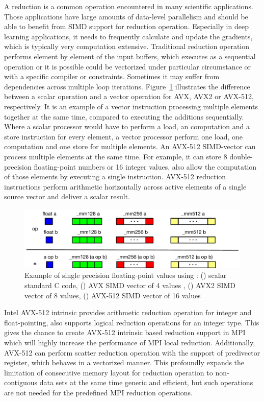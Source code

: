 \documentclass[5p,times,twocolumn]{elsarticle}
\newcommand{\mpi}[0]{\textsc{MPI}\xspace}
\begin{document}
A reduction is a common operation encountered in many scientific applications.
Those applications have large amounts of data-level parallelism and should be able
to benefit from SIMD support for reduction operation. Especially in deep learning applications,
it needs to frequently calculate and update the gradients, which is typically very computation extensive.
Traditional reduction operation performs element by element of the input buffers,
which executes as a sequential operation or it is possible could be vectorized
under particular circumstance or with a specific compiler or constraints. Sometimes
it may suffer from dependencies across multiple loop iterations.
%
Figure~\ref{fig:sseavx} illustrates the difference between a scalar operation and
a vector operation for AVX, AVX2 or AVX-512, respectively.
%
It is an example of a vector instruction processing multiple elements together at the same time,
compared to executing the additions sequentially. Where a scalar processor would have to perform a load, an
computation and a store instruction for every element, a vector processor perform one load, one computation and
one store for multiple elements.
An AVX-512 SIMD-vector can process multiple elements at
the same time. For example, it can store 8 double-precision floating-point numbers or 16 integer values, also allow the computation of those elements by executing a single instruction.
AVX-512 reduction instructions perform arithmetic horizontally across active elements of a
single source vector and deliver a scalar result.

\begin{figure}[h]
    \centering
    \includegraphics[width=\linewidth]{sse_avx.pdf}
    \caption{Example of single precision floating-point values using : (\colorbox{blue}{}) scalar standard C code, (\colorbox{green}{}) AVX SIMD vector of 4 values , (\colorbox{red}{}) AVX2 SIMD vector of 8 values, (\colorbox{yellow}{}) AVX-512 SIMD vector of 16 values}
    \label{fig:sseavx}
\end{figure}

Intel AVX-512 intrinsic provides arithmetic reduction operation for integer and
float-pointing, also supports logical reduction operations for an integer type.
This gives the chance to create AVX-512 intrinsic based reduction support in \mpi which
will highly increase the performance of \mpi local reduction.
Additionally, AVX-512 can perform scatter reduction operation with the
support of predivector register, which behaves in a vectorized manner. This profoundly
expands the limitation of consecutive memory layout for reduction operation to non-contiguous
data sets at the same time generic and efficient, but such operations
are not needed for the predefined MPI reduction operations.
\end{document}
